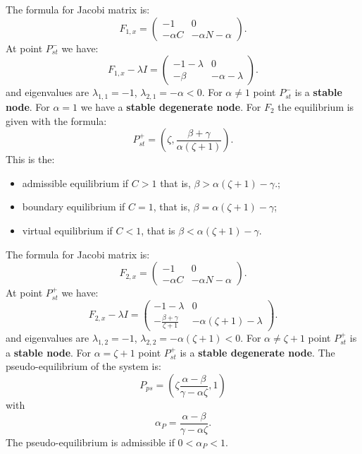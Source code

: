 \documentclass[12pt,a4paper]{article}
\begin{document}
The formula for Jacobi matrix is:
\begin{equation}
    F_{1,x} = \begin{pmatrix}
        -1 & 0 \\
        -\alpha C & -\alpha N - \alpha
        \end{pmatrix}.
\end{equation}
At point $P_{st}^{-}$ we have:
\begin{equation}
    F_{1, x} - \lambda I = \begin{pmatrix}
        -1-\lambda & 0 \\
        -\beta & -\alpha - \lambda
        \end{pmatrix}.
\end{equation}
and eigenvalues are $\lambda_{1, 1} = -1$, $\lambda_{2, 1} = -\alpha < 0.$ For $\alpha \neq 1$ point $P_{st}^{-}$ is a \textbf{stable node}. For $\alpha=1$ we have a \textbf{stable degenerate node}.
For $F_2$ the equilibrium is given with the formula:
\begin{equation}\label{eqn:critical_point_plus}
    P_{st}^{+} = \left(\zeta, \frac{\beta + \gamma}{\alpha (\zeta + 1)} \right).
\end{equation}
This is the:
\begin{itemize}
    \item admissible equilibrium if $C>1$ that is, $\beta > \alpha(\zeta + 1) - \gamma.$;
    \item boundary equilibrium if $C=1$, that is, $\beta = \alpha(\zeta + 1) - \gamma$;
    \item virtual equilibrium if $C<1$, that is $\beta < \alpha(\zeta + 1) - \gamma.$
\end{itemize}
The formula for Jacobi matrix is:
\begin{equation}
    F_{2,x} = \begin{pmatrix}
        -1 & 0 \\
        -\alpha C & -\alpha N - \alpha
        \end{pmatrix}.
\end{equation}
At point $P_{st}^{+}$ we have:
\begin{equation}
     F_{2, x} - \lambda I = \begin{pmatrix}
        -1-\lambda & 0 \\
        -\frac{\beta + \gamma}{\zeta + 1} & -\alpha (\zeta + 1)- \lambda
        \end{pmatrix}.
\end{equation}
and eigenvalues are $\lambda_{1, 2} = -1$, $\lambda_{2, 2} = -\alpha (\zeta + 1) < 0.$ For $\alpha \neq \zeta + 1$ point $P_{st}^{+}$ is a \textbf{stable node}. For $\alpha = \zeta + 1$ point $P_{st}^{+}$ is a \textbf{stable degenerate node}.
\newline The pseudo-equilibrium of the system is:
\begin{equation}
    P_{ps} = \left(\zeta \frac{\alpha  - \beta}{\gamma - \alpha \zeta}, 1 \right)
\end{equation}
with 
\begin{equation}
    \alpha_P = \frac{\alpha - \beta}{\gamma - \alpha \zeta}.
\end{equation}
The pseudo-equilibrium is admissible if $0 < \alpha_P < 1$.
\end{document}
